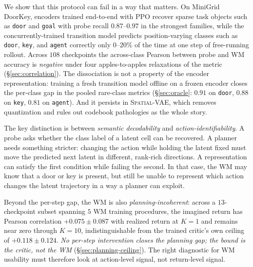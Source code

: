 \documentclass{article}
\newcommand{\encSpatialVAE}{\textsc{Spatial-VAE}}
\begin{document}
We show that this protocol can fail in a way that matters. On MiniGrid DoorKey, encoders trained end-to-end with PPO recover sparse task objects such as \texttt{door} and \texttt{goal} with probe recall $0.87$--$0.97$ in the strongest families, while the concurrently-trained transition model predicts position-varying classes such as \texttt{door}, \texttt{key}, and \texttt{agent} correctly only $0$--$20\%$ of the time at one step of free-running rollout. Across $108$ checkpoints the across-class Pearson between probe and WM accuracy is \emph{negative} under four apples-to-apples relaxations of the metric (\S\ref{sec:correlation}). The dissociation is not a property of the encoder representation: training a fresh transition model offline on a frozen encoder closes the per-class gap in the pooled rare-class metrics (\S\ref{sec:oracle}: $0.91$ on \texttt{door}, $0.88$ on \texttt{key}, $0.81$ on \texttt{agent}). And it persists in \encSpatialVAE{}, which removes quantization and rules out codebook pathologies as the whole story.

The key distinction is between \emph{semantic decodability} and \emph{action-identifiability}. A probe asks whether the class label of a latent cell can be recovered. A planner needs something stricter: changing the action while holding the latent fixed must move the predicted next latent in different, rank-rich directions. A representation can satisfy the first condition while failing the second. In that case, the WM may know that a door or key is present, but still be unable to represent which action changes the latent trajectory in a way a planner can exploit.

Beyond the per-step gap, the WM is also \emph{planning-incoherent}: across a $13$-checkpoint subset spanning $5$ WM training procedures, the imagined return has Pearson correlation $+0.075\pm0.087$ with realized return at $K{=}1$ and remains near zero through $K{=}10$, indistinguishable from the trained critic's own ceiling of $+0.118\pm0.124$. \emph{No per-step intervention closes the planning gap; the bound is the critic, not the WM} (\S\ref{sec:planning-ceiling}). The right diagnostic for WM usability must therefore look at action-level signal, not return-level signal.
\end{document}
